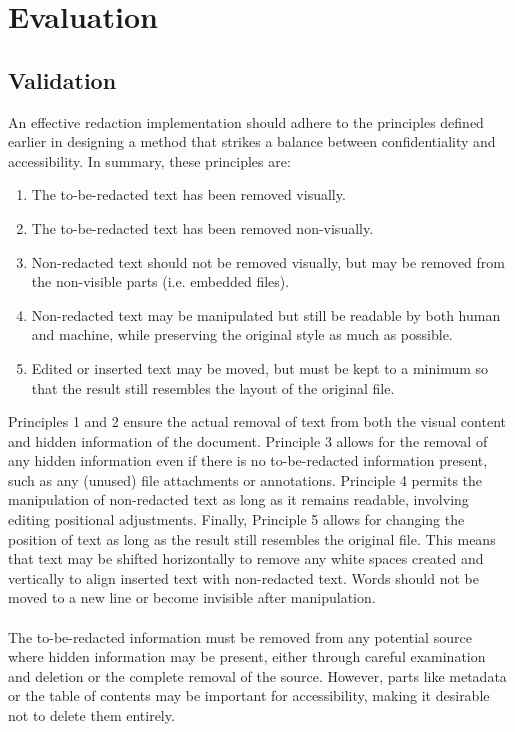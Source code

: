 \chapter{Evaluation}


\section{Validation}
An effective redaction implementation should adhere to the principles defined earlier in designing a method that strikes a balance between confidentiality and accessibility. In summary, these principles are:

\begin{enumerate}
    \item The to-be-redacted text has been removed visually.
    \item The to-be-redacted text has been removed non-visually.
    \item Non-redacted text should not be removed visually, but may be removed from the non-visible parts (i.e. embedded files).
    \item Non-redacted text may be manipulated but still be readable by both human and machine, while preserving the original style as much as possible.
    \item Edited or inserted text may be moved, but must be kept to a minimum so that the result still resembles the layout of the original file.
\end{enumerate}

Principles 1 and 2 ensure the actual removal of text from both the visual content and hidden information of the document. Principle 3 allows for the removal of any hidden information even if there is no to-be-redacted information present, such as any (unused) file attachments or annotations. Principle 4 permits the manipulation of non-redacted text as long as it remains readable, involving editing positional adjustments. Finally, Principle 5 allows for changing the position of text as long as the result still resembles the original file. This means that text may be shifted horizontally to remove any white spaces created and vertically to align inserted text with non-redacted text. Words should not be moved to a new line or become invisible after manipulation.
\\\\
The to-be-redacted information must be removed from any potential source where hidden information may be present, either through careful examination and deletion or the complete removal of the source. However, parts like metadata or the table of contents may be important for accessibility, making it desirable not to delete them entirely.


